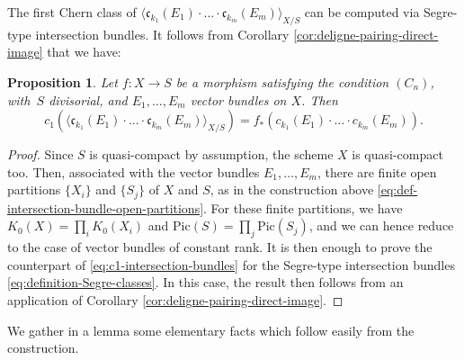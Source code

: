 \documentclass[11pt]{article}
\theoremstyle{plain}
\newtheorem{proposition}[theorem]{Proposition}
\theoremstyle{definition}
\newcommand{\cfrak}{\mathfrak c}
\newcommand{\Pic}{\mathrm{Pic}}
\begin{document}
The first Chern class of $\langle \cfrak_{k_{1}}(E_{1})\cdot\ldots \cdot \cfrak_{k_{m}}(E_{m})\rangle_{X/S}$ can be computed via Segre-type intersection bundles. It follows from Corollary \ref{cor:deligne-pairing-direct-image} that we have:
\begin{proposition}\label{prop:chernclassofIntbundle}
Let $f\colon X \to S$ be a morphism satisfying the condition $(C_n)$, with~$S$ divisorial, and $E_1, \ldots, E_m$ vector bundles on $X$. Then
\begin{equation}\label{eq:c1-intersection-bundles}
c_1 (\langle \cfrak_{k_{1}}(E_{1})\cdot\ldots \cdot \cfrak_{k_{m}}(E_{m})\rangle_{X/S}) = f_\ast (c_{k_{1}}(E_{1})\cdot\ldots \cdot c_{k_{m}}(E_{m}) ).
\end{equation}
\end{proposition}
\begin{proof}
Since $S$ is quasi-compact by assumption, the scheme $X$ is quasi-compact too. Then, associated with the vector bundles $E_{1},\ldots, E_{m}$, there are finite open partitions $\lbrace X_{i}\rbrace$ and $\lbrace S_{j}\rbrace$ of $X$ and $S$, as in the construction above \eqref{eq:def-intersection-bundle-open-partitions}. For these finite partitions, we have $K_{0}(X)=\prod_{i}K_{0}(X_{i})$ and $\Pic(S)=\prod_{j}\Pic(S_{j})$, and we can hence reduce to the case of vector bundles of constant rank. It is then enough to prove the counterpart of \eqref{eq:c1-intersection-bundles} for the Segre-type intersection bundles \eqref{eq:definition-Segre-classes}. In this case, the result then follows from an application of Corollary \ref{cor:deligne-pairing-direct-image}.
\end{proof}

We gather in a lemma some elementary facts which follow easily from the construction.
\end{document}
